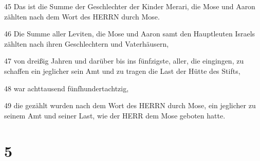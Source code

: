 \par 45 Das ist die Summe der Geschlechter der Kinder Merari, die Mose und Aaron zählten nach dem Wort des HERRN durch Mose.
\par 46 Die Summe aller Leviten, die Mose und Aaron samt den Hauptleuten Israels zählten nach ihren Geschlechtern und Vaterhäusern,
\par 47 von dreißig Jahren und darüber bis ins fünfzigste, aller, die eingingen, zu schaffen ein jeglicher sein Amt und zu tragen die Last der Hütte des Stifts,
\par 48 war achttausend fünfhundertachtzig,
\par 49 die gezählt wurden nach dem Wort des HERRN durch Mose, ein jeglicher zu seinem Amt und seiner Last, wie der HERR dem Mose geboten hatte.

\chapter{5}

